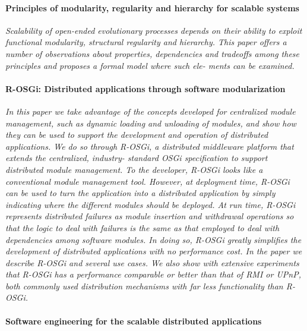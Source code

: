 \documentclass{article}
\begin{document}
\paragraph{Principles of modularity, regularity and hierarchy for scalable
systems} \cite{lipson2007principles}

\emph{Scalability of open-ended evolutionary processes depends on their ability
to exploit functional modularity, structural regularity and hierarchy.  This
paper offers a number of observations about properties, dependencies and
tradeoffs among these principles and proposes a formal model where such ele-
ments can be examined.}

\paragraph{R-OSGi: Distributed applications through software modularization}
\cite{rellermeyer2007r}

\emph{In this paper we take advantage of the concepts developed for centralized
module management, such as dynamic loading and unloading of modules, and show
how they can be used to support the development and operation of distributed
applications. We do so through R-OSGi, a distributed middleware platform that
extends the centralized, industry- standard OSGi specification to support
distributed module management.  To the developer, R-OSGi looks like a
conventional module management tool. However, at deployment time, R-OSGi can be
used to turn the application into a distributed application by simply
indicating where the different modules should be deployed. At run time, R-OSGi
represents distributed failures as module insertion and withdrawal operations
so that the logic to deal with failures is the same as that employed to deal
with dependencies among software modules. In doing so, R-OSGi greatly
simplifies the development of distributed applications with no performance
cost. In the paper we describe R-OSGi and several use cases.  We also show with
extensive experiments that R-OSGi has a performance comparable or better than
that of RMI or UPnP, both commonly used distribution mechanisms with far less
functionality than R-OSGi.}

\paragraph{Software engineering for the scalable distributed applications}
\cite{van1998software}
\end{document}
